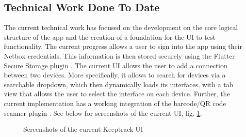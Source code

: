 \documentclass [11pt,a4paper]{article}
\begin{document}
\subsection{Technical Work Done To Date}
\label{sec:technical_work}
The current technical work has focused on the development on the core logical structure of the app and the creation of a foundation for the UI to test functionality. The current progress allows a user to sign into the app using their Netbox credentials. This information is then stored securely using the Flutter Secure Storage plugin \cite{securestorage}. The current UI allows the user to add a connection between two devices. More specifically, it allows to search for devices via a searchable dropdown, which then dynamically loads its interfaces, with a tab view that allows the user to select the interface on each device. Further, the current implementation has a working integration of the barcode/QR code scanner plugin \cite{barcodeScannerPlugin}. See below for screenshots of the current UI, fig. \ref{fig:currentUIScreenshots}. 

\begin{figure}%
    \centering
    \qquad
    \qquad
    \caption{Screenshots of the current Keeptrack UI}%
    \label{fig:currentUIScreenshots}%
\end{figure}
\end{document}
